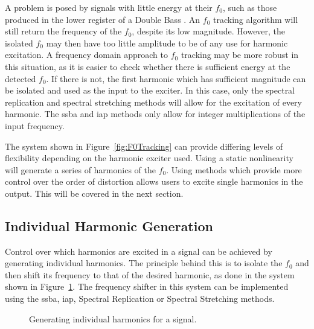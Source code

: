 		A problem is posed by signals with little energy at their $f_{0}$, such as those produced in the lower
		register of a Double Bass \citep{askenfelt2010double}. An $f_{0}$ tracking algorithm will still return the
		frequency of the $f_{0}$, despite its low magnitude. However, the isolated $f_{0}$ may then have too little
		amplitude to be of any use for harmonic excitation. A frequency domain approach to $f_{0}$ tracking may be
		more robust in this situation, as it is easier to check whether there is sufficient energy at the detected
		$f_{0}$. If there is not, the first harmonic which has sufficient magnitude can be isolated and used as the
		input to the exciter. In this case, only the spectral replication and spectral stretching methods will
		allow for the excitation of every harmonic. The \acrshort{ssba} and \acrshort{iap} methods only allow for
		integer multiplications of the input frequency.

		The system shown in Figure~\ref{fig:F0Tracking} can provide differing levels of flexibility depending on
		the harmonic exciter used. Using a static nonlinearity will generate a series of harmonics of the $f_{0}$.
		Using methods which provide more control over the order of distortion allows users to excite single
		harmonics in the output. This will be covered in the next section.

	\subsection{Individual Harmonic Generation}
	\label{sec:FeatureControl-Systems-Individuals}
		Control over which harmonics are excited in a signal can be achieved by generating individual harmonics.
		The principle behind this is to isolate the $f_{0}$ and then shift its frequency to that of the desired
		harmonic, as done in the system shown in Figure~\ref{fig:HarmonicGenerationSystem}.  The frequency shifter
		in this system can be implemented using the \acrshort{ssba}, \acrshort{iap}, Spectral Replication or
		Spectral Stretching methods.

		\begin{figure}[h!]
			\centering
			\caption{Generating individual harmonics for a signal.}
			\label{fig:HarmonicGenerationSystem}
		\end{figure}

